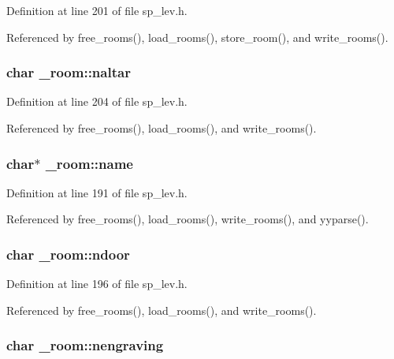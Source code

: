 Definition at line 201 of file sp\+\_\+lev.\+h.



Referenced by free\+\_\+rooms(), load\+\_\+rooms(), store\+\_\+room(), and write\+\_\+rooms().

\hypertarget{struct__room_a6e5fedf04693d5601d2fe64a2402963f}{
\subsubsection[{naltar}]{\setlength{\rightskip}{0pt plus 5cm}char \+\_\+room\+::naltar}}\label{struct__room_a6e5fedf04693d5601d2fe64a2402963f}


Definition at line 204 of file sp\+\_\+lev.\+h.



Referenced by free\+\_\+rooms(), load\+\_\+rooms(), and write\+\_\+rooms().

\hypertarget{struct__room_aca2280b1ca899bab061cca7b062ce195}{
\subsubsection[{name}]{\setlength{\rightskip}{0pt plus 5cm}char$\ast$ \+\_\+room\+::name}}\label{struct__room_aca2280b1ca899bab061cca7b062ce195}


Definition at line 191 of file sp\+\_\+lev.\+h.



Referenced by free\+\_\+rooms(), load\+\_\+rooms(), write\+\_\+rooms(), and yyparse().

\hypertarget{struct__room_adf93ac64ee6c689fc8faf034101104d2}{
\subsubsection[{ndoor}]{\setlength{\rightskip}{0pt plus 5cm}char \+\_\+room\+::ndoor}}\label{struct__room_adf93ac64ee6c689fc8faf034101104d2}


Definition at line 196 of file sp\+\_\+lev.\+h.



Referenced by free\+\_\+rooms(), load\+\_\+rooms(), and write\+\_\+rooms().

\hypertarget{struct__room_a3490cb38c5c28a5b859ad715371f9a03}{
\subsubsection[{nengraving}]{\setlength{\rightskip}{0pt plus 5cm}char \+\_\+room\+::nengraving}}\label{struct__room_a3490cb38c5c28a5b859ad715371f9a03}


